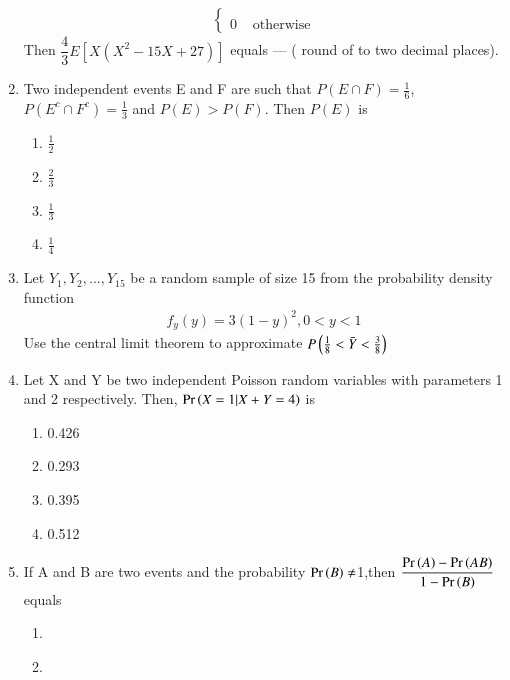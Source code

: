 \documentclass[journal,12pt,twocolumn]{IEEEtran}
\begin{document}
\begin{enumerate}
\begin{align}
\begin{cases}
\\
0 & \text{ otherwise}
\end{cases}
\end{align}
Then $\dfrac{4}{3} E [X(X^2 -15X + 27 ) ] $ equals --- ( round of to two decimal places). \\
\solution
  
%
\item Two independent events E and F are such that $P(E\cap F) = \displaystyle\frac{1}{6}$,$P(E^c\cap F^c)=\displaystyle\frac{1}{3}$ and $P(E)>P(F)$. Then $P(E)$ is
\begin{enumerate}[label=(\Alph*)]
    \item $\displaystyle\frac{1}{2}$\\
    \item $\displaystyle\frac{2}{3}$\\
    \item $\displaystyle\frac{1}{3}$\\
    \item $\displaystyle\frac{1}{4}$
\end{enumerate}
%
\solution
  
%
\item Let $Y_{1},Y_{2},...,Y_{15}$ be a random sample of size 15 from the probability density function 
\begin{align}
\tag{Eq:1}
    f_{y}(y)=3(1-y)^{2} , 0<y<1
\end{align}
Use the central limit theorem to approximate $P\left(\frac{1}{8}<\Bar{Y}<\frac{3}{8}\right)$
%
\solution
  
%
\item Let X and Y be two independent Poisson random variables with parameters 1 and 2 respectively. Then, $\Pr\left(X=1 | X+Y = 4\right)$ is 
\begin{enumerate}[label=\Alph*)]
    \item 0.426
    \item 0.293
    \item 0.395
    \item 0.512
\end{enumerate}
%
\solution
  
%
\item If A and B are two events and the 
probability $\Pr\left(B\right)\neq$1,then  
$\dfrac{\Pr\left(A\right)-\Pr\left(A B\right)}{1-\Pr\left(B\right)}$ equals \\
\begin{enumerate}
    \item {}\\
    \item {}\\

\end{enumerate}
\end{enumerate}
\end{document}
